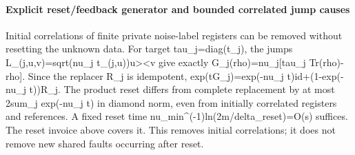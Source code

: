 \documentclass[
]{article}
\begin{document}
\paragraph{Explicit reset/feedback generator and bounded correlated jump
causes}\label{explicit-resetfeedback-generator-and-bounded-correlated-jump-causes}

Initial correlations of finite private noise-label registers can be
removed without resetting the unknown data. For target
t\allowbreak{}a\allowbreak{}u\allowbreak{}\_\allowbreak{}j\allowbreak{}=\allowbreak{}d\allowbreak{}i\allowbreak{}a\allowbreak{}g\allowbreak{}(\allowbreak{}t\allowbreak{}\_\allowbreak{}j\allowbreak{})\allowbreak{},
the jumps
L\allowbreak{}\_\allowbreak{}(\allowbreak{}j\allowbreak{},\allowbreak{}u\allowbreak{},\allowbreak{}v\allowbreak{})\allowbreak{}=\allowbreak{}s\allowbreak{}q\allowbreak{}r\allowbreak{}t\allowbreak{}(\allowbreak{}n\allowbreak{}u\allowbreak{}\_\allowbreak{}j
t\_(j,u))\textbar u\textgreater\textless v\textbar{} give exactly
G\allowbreak{}\_\allowbreak{}j\allowbreak{}(\allowbreak{}r\allowbreak{}h\allowbreak{}o\allowbreak{})\allowbreak{}=\allowbreak{}n\allowbreak{}u\allowbreak{}\_\allowbreak{}j\allowbreak{}[\allowbreak{}t\allowbreak{}a\allowbreak{}u\allowbreak{}\_\allowbreak{}j
Tr(rho)-rho{]}. Since the replacer R\_j is idempotent,
e\allowbreak{}x\allowbreak{}p\allowbreak{}(\allowbreak{}t\allowbreak{}G\allowbreak{}\_\allowbreak{}j\allowbreak{})\allowbreak{}=\allowbreak{}e\allowbreak{}x\allowbreak{}p\allowbreak{}(\allowbreak{}-\allowbreak{}n\allowbreak{}u\allowbreak{}\_\allowbreak{}j
t\allowbreak{})\allowbreak{}i\allowbreak{}d\allowbreak{}+\allowbreak{}(\allowbreak{}1\allowbreak{}-\allowbreak{}e\allowbreak{}x\allowbreak{}p\allowbreak{}(\allowbreak{}-\allowbreak{}n\allowbreak{}u\allowbreak{}\_\allowbreak{}j
t))R\_j. The product reset differs from complete replacement by at most
2sum\_j exp(-nu\_j t) in diamond norm, even from initially correlated
registers and references. A fixed reset time
n\allowbreak{}u\allowbreak{}\_\allowbreak{}m\allowbreak{}i\allowbreak{}n\allowbreak{}\^{}\allowbreak{}(\allowbreak{}-\allowbreak{}1\allowbreak{})\allowbreak{}l\allowbreak{}n\allowbreak{}(\allowbreak{}2\allowbreak{}m\allowbreak{}/\allowbreak{}d\allowbreak{}e\allowbreak{}l\allowbreak{}t\allowbreak{}a\allowbreak{}\_\allowbreak{}r\allowbreak{}e\allowbreak{}s\allowbreak{}e\allowbreak{}t\allowbreak{})\allowbreak{}=\allowbreak{}O\allowbreak{}(\allowbreak{}s\allowbreak{})
suffices. The reset invoice above covers it. This removes initial
correlations; it does not remove new shared faults occurring after
reset.
\end{document}

